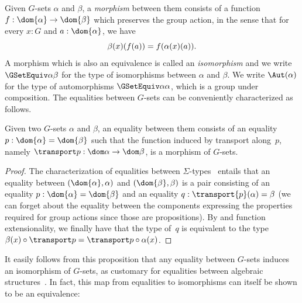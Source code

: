 Given $G$-sets $\alpha$ and $\beta$, a \emph{morphism} between them consists of
a function $f:\dom{\alpha}\to \dom{\beta}$ which preserves the group action, in
the sense that for every $x:G$ and $a:\dom{\alpha}$, we have
\begin{equation}
  \label{G-set-morphism}
  \beta(x)(f(a))=f(\alpha(x)(a))
  \text.
\end{equation}
A morphism which is also an equivalence is called an \emph{isomorphism} and we
write $\GSetEquiv\alpha\beta$ for the type of isomorphisms between $\alpha$ and
$\beta$. We write $\Aut(\alpha)$ for the type of automorphisms
$\GSetEquiv\alpha\alpha$, which is a group under composition.
%
The equalities between $G$-sets can be conveniently characterized as follows.

\begin{proposition}
  \label{Gset-equalities}
  Given two $G$-sets $\alpha$ and $\beta$, an equality between them consists of
  an equality $p:\dom{\alpha}=\dom{\beta}$ such that the function induced by
  transport along~$p$, namely $\transport p:\dom\alpha\to\dom\beta$, is a
  morphism of $G$-sets.
\end{proposition}
\begin{proof}
  The characterization of equalities between
  $\Sigma$-types~\cite[Theorem~2.7.2]{hottbook} entails that an equality between
  $(\dom{\alpha},\alpha)$ and $(\dom{\beta},\beta)$ is a pair consisting of an
  equality $p:\dom{\alpha}=\dom{\beta}$ and an equality $q:\transport{p}(\alpha)=\beta$ (we can forget
  about the equality between the components expressing the properties required
  for group actions since those are propositions). By
  \cite[Lemma~2.9.6]{hottbook} and function extensionality, we finally have that
  the type of~$q$ is equivalent to the type
  $\beta(x)\circ\transport p=\transport p\circ\alpha(x)$.
\end{proof}

\noindent
It easily follows from this proposition that any equality between $G$-sets
induces an isomorphism of $G$-sets, as customary for equalities between
algebraic structures~\cite[Section~2.14]{hottbook}. In fact, this map from
equalities to isomorphisms can itself be shown to be an equivalence:

